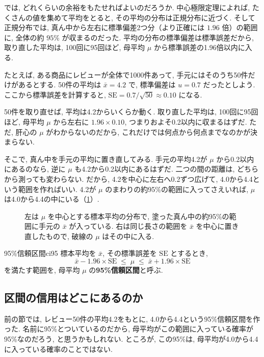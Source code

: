     では, どれくらいの余裕をもたせればよいのだろうか.
    中心極限定理によれば, たくさんの値を集めて平均をとると, その平均の分布は正規分布に近づく.
    そして正規分布では, 真ん中から左右に標準偏差2つ分（より正確には $1.96$ 倍）の範囲に, 全体の約 $95\%$ が収まるのだった.
    平均の分布の標準偏差は標準誤差だから, 取り直した平均は, 100回に95回ほど, 母平均 $\mu$ から標準誤差の1.96倍以内に入る.

    たとえば, ある商品にレビューが全体で1000件あって, 手元にはそのうち50件だけがあるとする.
    50件の平均は $\bar{x} = 4.2$ で, 標準偏差は $u = 0.7$ だったとしよう.
    ここから標準誤差を計算すると, $\mathrm{SE} = 0.7 / \sqrt{50} \approx 0.10$ になる.

    50件を取り直せば, 平均は4.2からいくらか動く.
    取り直した平均は, 100回に95回ほど, 母平均 $\mu$ から左右に $1.96 \times 0.10$, つまりおよそ0.2以内に収まるはずだ.
    ただ, 肝心の $\mu$ がわからないのだから, これだけでは何点から何点までなのかが決まらない.

    そこで, 真ん中を手元の平均に置き直してみる.
    手元の平均4.2が $\mu$ から0.2以内にあるのなら, 逆に $\mu$ も4.2から0.2以内にあるはずだ.
    二つの間の距離は, どちらから測っても変わらない.
    だから, 4.2を中心に左右へ0.2ずつ広げて, 4.0から4.4という範囲を作ればいい.
    4.2が $\mu$ のまわりの約95\%の範囲に入ってさえいれば, $\mu$ は4.0から4.4の中にいる（\cref{fig:ch04-ci-flip}）.

    \begin{figure}[htbp]
      \centering
      
      \caption{左は $\mu$ を中心とする標本平均の分布で, 塗った真ん中の約95\%の範囲に手元の $\bar{x}$ が入っている. 右は同じ長さの範囲を $\bar{x}$ を中心に置き直したもので, 破線の $\mu$ はその中に入る.}
      \label{fig:ch04-ci-flip}
    \end{figure}

    \begin{defi}{95\%信頼区間}{ci95}
      標本平均を $\bar{x}$, その標準誤差を $\mathrm{SE}$ とするとき,
      \[
        \bar{x} - 1.96 \times \mathrm{SE} \;\leq\; \mu \;\leq\; \bar{x} + 1.96 \times \mathrm{SE}
      \]
      を満たす範囲を, 母平均 $\mu$ の\textbf{95\%信頼区間}と呼ぶ.
    \end{defi}

  \subsection{区間の信用はどこにあるのか}

    前の節では, レビュー50件の平均4.2をもとに, 4.0から4.4という95\%信頼区間を作った.
    名前に95\%とついているのだから, 母平均がこの範囲に入っている確率が95\%なのだろう, と思うかもしれない.
    ところが, この95\%は, 母平均が4.0から4.4に入っている確率のことではない.

